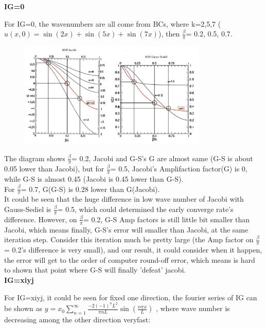 \documentclass[12pt]{article}
\begin{document}
\textbf{IG=0}

For IG=0, the wavenumbers are all come from BCs, where k=2,5,7
($u(x,0) = \sin(2x) + \sin(5x) + \sin(7x)$), then $\frac{\beta}{\pi}$= 0.2, 0.5, 0.7.



\begin{figure}[H]
    \centering
    \includegraphics[width=0.8\textwidth]{IGs.jpg}
    \label{IGs.jpg}
\end{figure}


The diagram shows $\frac{\beta}{\pi}$= 0.2, Jacobi and G-S's G are almost same
(G-S is about 0.05 lower than Jacobi),
but for $\frac{\beta}{\pi}$= 0.5, Jacobi's Amplifaction factor(G) is 0, while G-S is 
almost 0.45 (Jacobi is 0.45 lower than G-S).\\

For $\frac{\beta}{\pi}$= 0.7, G(G-S) is 0.28 lower than G(Jacobi).\\


It could be seen that the huge difference in low wave number of Jacobi with
Gauss-Sediel is $\frac{\beta}{\pi}$= 0.5, which could determined the early converge 
rate's difference. However, on $\frac{\beta}{\pi}$= 0.2, G-S Amp factors
is still little bit smaller than Jacobi, which means finally, G-S's error will
smaller than Jacobi, at the same iteration step. Consider this iteration much be
pretty large (the Amp factor on $\frac{\beta}{\pi}$= 0.2's difference is very small), 
and our result, it could consider when it happen, the error will get to the order
of computer round-off error, which means is hard to shown that point where G-S will
finally 'defeat' jacobi.\\

\textbf{IG=xiyj}

For IG=xiyj, it could be seen for fixed one direction, the fourier series of IG can 
be shown as $y = x_{0} \sum_{n=1}^{\infty} \frac{-2(-1)^n L^2}{\pi n L} \sin\left(\frac{n\pi x}{L}\right)$
, where wave number is decreasing among the other direction veryfast: 
\end{document}
